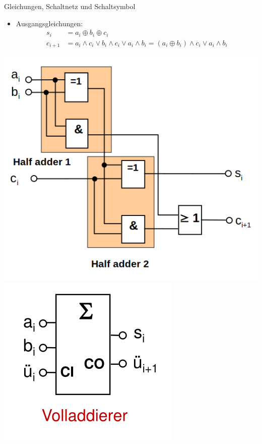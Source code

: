 \documentclass[12pt%
,xcolor=table
,aspectratio=169%
]{beamer}
\begin{document}
\begin{frame}{Gleichungen, Schaltnetz und Schaltsymbol}
\begin{itemize}
	\item Ausgangsgleichungen:
	\begin{align*}
	s_i & = a_i \oplus b_i \oplus c_i \\
	c_{i+1} &= a_i \land c_i \lor b_i \land c_i \lor a_i \land b_i = (a_i \oplus b_i) \land c_i \lor a_i \land b_i
	\end{align*}
\end{itemize}
  \includegraphics[scale=0.35]{pictures/fulladder1}
\endminipage \hfill
{}%
  \includegraphics[scale=0.3]{pictures/fulladder2}
\endminipage
\end{frame}
\end{document}
